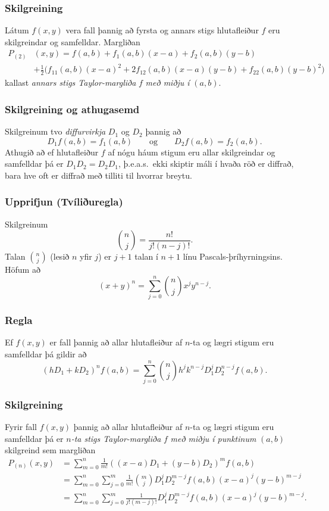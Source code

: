 \subsubsection{Skilgreining }

Látum $f(x,y)$ vera fall þannig að fyrsta og annars
stigs hlutafleiður $f$ eru skilgreindar og samfelldar.  Margliðan
\begin{align*}P_{(2)}&(x,y)=f(a,b)+f_1(a,b)(x-a)+f_2(a,b)(y-b)\\
&+\frac{1}{2}\big(f_{11}(a,b)(x-a)^2+
2f_{12}(a,b)(x-a)(y-b)+f_{22}(a,b)(y-b)^2\big)
\end{align*}
kallast {\em annars stigs Taylor-margliða} $f$ {\em með miðju í} $(a,b)$.  



\subsubsection{Skilgreining og athugasemd }
Skilgreinum tvo {\em diffurvirkja} $D_1$ og $D_2$ þannig að 
$$D_1f(a,b)=f_1(a,b)\qquad\mbox{og}\qquad
D_2f(a,b)=f_2(a,b).$$
Athugið að ef hlutafleiður $f$ af nógu háum stigum eru allar skilgreindar og samfelldar þá er $D_1D_2=D_2D_1$, þ.e.a.s.\ ekki skiptir máli í hvaða röð er diffrað, bara hve oft er diffrað með tilliti til hvorrar breytu.




\subsubsection{Upprifjun (Tvíliðuregla)}
Skilgreinum 
$${n\choose j}=\frac{n!}{j!(n-j)!}.$$
Talan ${n\choose j}$ (lesið $n$ yfir $j$) er $j+1$ talan í $n+1$ línu Pascals-þríhyrningsins.
 Höfum að 
$$(x+y)^n=\sum_{j=0}^n \textstyle{n\choose j}x^jy^{n-j}.$$




\subsubsection{Regla }

Ef $f(x,y)$ er fall þannig að allar hlutafleiður af $n$-ta og lægri stigum eru samfelldar þá gildir að 
$$(hD_1+kD_2)^nf(a,b)=\sum_{j=0}^n \textstyle{n\choose j}
h^jk^{n-j}D_1^jD_2^{n-j}f(a,b).$$



\subsubsection{Skilgreining }
Fyrir fall $f(x,y)$ þannig að allar
hlutafleiður af $n$-ta og lægri stigum eru samfelldar þá er $n${\em-ta
stigs Taylor-margliða} $f$ {\em með miðju í punktinum} $(a,b)$ skilgreind sem
margliðan  
\begin{align*}
P_{(n)}(x,y)&= \sum_{m=0}^n \frac{1}{m!}((x-a)D_1+(y-b)D_2)^m f(a,b)\\
&=\sum_{m=0}^n\sum_{j=0}^m \frac{1}{m!}\textstyle{m\choose j}
D_1^jD_2^{m-j}f(a,b)(x-a)^j(y-b)^{m-j}\\
&=\sum_{m=0}^n\sum_{j=0}^m \frac{1}{j!(m-j)!}
D_1^jD_2^{m-j}f(a,b)(x-a)^j(y-b)^{m-j}.
\end{align*}




